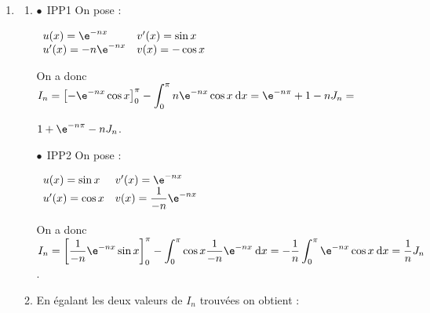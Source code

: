 \begin{enumerate}
\begin{enumerate}
$\displaystyle\int_0^{\pi} 0\:\text{d}x \leqslant I_n \leqslant \displaystyle\int_0^{\pi}\e^{-n\pi}\:\text{d}x$.

\[I_n \leqslant \displaystyle\int_0^{\pi} \text{e}^{- nx}\:\text{d}x.\]
		
		\item 

Une primitive de $\text{e}^{- nx}$est $\dfrac{1}{- n}\text{e}^{- nx}$, donc pour $n \geqslant 1$, \: $\displaystyle\int_0^{\pi} \text{e}^{- nx}\:\text{d}x = \left[\dfrac{1}{- n}\text{e}^{- nx}\right]_0^{\pi} = - \dfrac 1n\left[\e^{-n \pi} - \e^0\right] = - \dfrac 1n\left[\e^{-n \pi} - 1\right] = \dfrac{1 - \e^{-n \pi}}{n}.$
		\item 
On sait que $\displaystyle\lim_{n \to + \infty}\e^{-n \pi} = 0$, donc $\displaystyle\lim_{n \to + \infty} 1 - \e^{-n \pi} = 1$ et enfin $\displaystyle\lim_{n \to + \infty}\dfrac{1 - \e^{-n \pi}}{n} = 0$.

D'après le théorème des \og gendarmes \fg{} la suite $\left(I_n\right)$ a pour limite 0.
	\end{enumerate}
\item
	\begin{enumerate}
		\item 


$\bullet~~$IPP1 On pose :

$\begin{array}{l l}
u(x) = \e^{-nx}&v'(x) = \sin x\\
u'(x) = -n\e^{-nx}&v(x) = - \cos x
\end{array}$

On a donc $I_n = \left[- \e^{-nx}\cos x\right]_0^{\pi} - \displaystyle\int_0^{\pi} n\e^{-nx}\cos x\:\text{d}x  = \e^{-n \pi} + 1 - nJ_n =$

$ 1 + \e^{-n \pi} - nJ_n$.

$\bullet~~$IPP2 On pose :

$\begin{array}{l l}
u(x) = \sin x&v'(x) = \e^{-nx}\\
u'(x) = \cos x&v(x) = \dfrac{1}{-n}\e^{-nx} 
\end{array}$

On a donc $I_n = \left[\dfrac{1}{-n} \e^{-nx}\sin x \right]_0^{\pi} - \displaystyle\int_0^{\pi}\cos x\dfrac{1}{-n}\e^{-nx}\:\text{d}x = -\dfrac 1n \displaystyle\int_0^{\pi}\e^{-nx} \cos x\:\text{d}x =  \dfrac 1n J_n$.
		\item 

En égalant les deux valeurs de $I_n$ trouvées on obtient :


\end{enumerate}
\end{enumerate}
